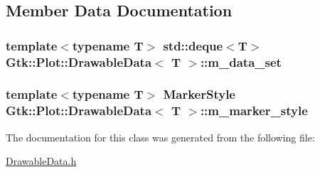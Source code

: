 \subsection{Member Data Documentation}
\hypertarget{classGtk_1_1Plot_1_1DrawableData_ac8c6f3506d6286cfb432ed9a3f411c75}{
\subsubsection[{m\_\-data\_\-set}]{\setlength{\rightskip}{0pt plus 5cm}template$<$typename T$>$ std::deque$<$T$>$ {\bf Gtk::Plot::DrawableData}$<$ T $>$::{\bf m\_\-data\_\-set}}}
\label{classGtk_1_1Plot_1_1DrawableData_ac8c6f3506d6286cfb432ed9a3f411c75}
\hypertarget{classGtk_1_1Plot_1_1DrawableData_a4eb6eed74d1be1a72e093ce307b8f27f}{
\subsubsection[{m\_\-marker\_\-style}]{\setlength{\rightskip}{0pt plus 5cm}template$<$typename T$>$ {\bf MarkerStyle} {\bf Gtk::Plot::DrawableData}$<$ T $>$::{\bf m\_\-marker\_\-style}}}
\label{classGtk_1_1Plot_1_1DrawableData_a4eb6eed74d1be1a72e093ce307b8f27f}


The documentation for this class was generated from the following file:\begin{DoxyCompactItemize}
\item 
\hyperlink{DrawableData_8h}{DrawableData.h}\end{DoxyCompactItemize}

